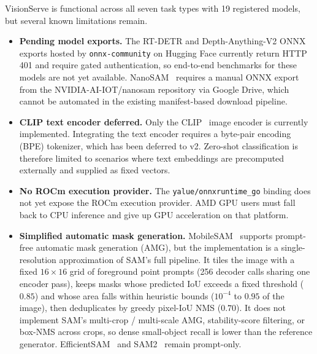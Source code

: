 VisionServe is functional across all seven task types with 19 registered models, but
several known limitations remain.

\begin{itemize}

    \item \textbf{Pending model exports.}
          The RT-DETR and Depth-Anything-V2 ONNX exports hosted by
          \texttt{onnx-community} on Hugging Face currently return HTTP 401 and require
          gated authentication, so end-to-end benchmarks for these models are not
          yet available. NanoSAM~\cite{zhang2023mobilesam} requires a manual ONNX export
          from the NVIDIA-AI-IOT/nanosam repository via Google Drive, which cannot be
          automated in the existing manifest-based download pipeline.

    \item \textbf{CLIP text encoder deferred.}
          Only the CLIP~\cite{radford2021clip} image encoder is currently implemented.
          Integrating the text encoder requires a byte-pair encoding (BPE) tokenizer,
          which has been deferred to v2. Zero-shot classification is therefore
          limited to scenarios where text embeddings are precomputed externally
          and supplied as fixed vectors.

    \item \textbf{No ROCm execution provider.}
          The \texttt{yalue/onnxruntime\_go} binding does not yet expose the ROCm
          execution provider. AMD GPU users must fall back to CPU inference and
          give up GPU acceleration on that platform.

    \item \textbf{Simplified automatic mask generation.}
          MobileSAM~\cite{zhang2023mobilesam} supports prompt-free automatic mask
          generation (AMG), but the implementation is a single-resolution approximation
          of SAM's full pipeline. It tiles the image with a fixed $16\times16$ grid of
          foreground point prompts (256 decoder calls sharing one encoder pass), keeps
          masks whose predicted IoU exceeds a fixed threshold ($0.85$) and whose area
          falls within heuristic bounds ($10^{-4}$ to $0.95$ of the image), then
          deduplicates by greedy pixel-IoU NMS ($0.70$). It does not implement
          SAM's multi-crop / multi-scale AMG, stability-score filtering, or box-NMS
          across crops, so dense small-object recall is lower than the reference
          generator. EfficientSAM~\cite{xiong2023efficientsam} and SAM2~\cite{ravi2024sam2}
          remain prompt-only.


\end{itemize}
